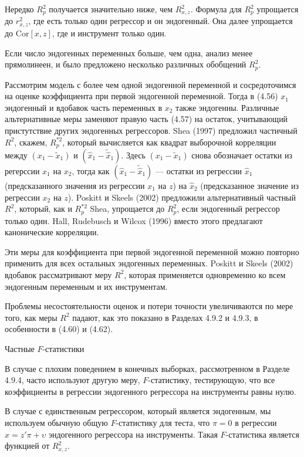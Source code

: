 Нередко $R^2_p$ получается значительно ниже, чем $R^2_{x,z}$. Формула для $R^2_p$ упрощается до $r^2_{x,z}$, где есть только один регрессор и он эндогенный. Она далее упрощается до $\mathrm{Cor}[x,z]$, где и инструмент только один.

Если число эндогенных переменных больше, чем одна, анализ менее прямолинеен, и было предложено несколько различных обобщений $R^2_p$.

Рассмотрим модель с более чем одной эндогенной переменной и сосредоточимся на оценке коэффициента при первой эндогенной переменной. Тогда в (4.56) $x_1$ эндогенный и вдобавок часть переменных в $x_2$ также эндогенны. Различные альтернативные меры заменяют правую часть (4.57) на остаток, учитывающий пристутствие других эндогенных регрессоров. Shea (1997) предложил частичный $R^2$, скажем, $R_p^{*2}$, который вычисляется как квадрат выборочной корреляции между $(x_1-\tilde{x}_1)$ и $(\hat{x}_1-\tilde{\hat{x}}_1)$. Здесь $(x_1-\tilde{x}_1)$ снова обозначает остатки из регерссии $x_1$ на $x_2$, тогда как  $(\hat{x}_1-\tilde{\hat{x}}_1)$ --- остатки из регрессии $\hat{x}_1$ (предсказанного значения из регрессии $x_1$ на $z$) на $\hat{x}_2$ (предсказанное значение из регрессии $x_2$ на $z$). Poskitt и Skeels (2002) предложили альтернативный частный $R^2$, который, как и $R_p^{*2}$ Shea, упрощается до $R^2_p$, если эндогенный регрессор только один. Hall, Rudebusch и Wilcox (1996) вместо этого предлагают канонические корреляции.

Эти меры для коэффициента при первой эндогенной переменной можно повторно применить для всех остальных эндогенных переменных.  Poskitt и Skeels (2002) вдобавок рассматривают меру $R^2$, которая применяется одновременно ко всем эндогенным переменным и их инструментам.

Проблемы несостоятельности оценок и потери точности увеличиваются по мере того, как меры $R^2$ падают, как это показано в Разделах 4.9.2 и 4.9.3, в особенности в (4.60) и (4.62).
\begin{center}
Частные $F$-статистики
\end{center}
В случае с плохим поведением в конечных выборках, рассмотренном в Разделе 4.9.4, часто используют другую меру, $F$-статистику, тестирующую, что все коэффициенты в регрессии эндогенного регрессора на инструменты равны нулю. 

В случае с единственным регрессором, который является эндогенным, мы используем обычную общую $F$-статистику для теста, что $\pi=0$ в регрессии $x=z'\pi+\upsilon$ эндогенного регрессора на инструменты. Такая $F$-статистика является функцией от $R^2_{x,z}$.

